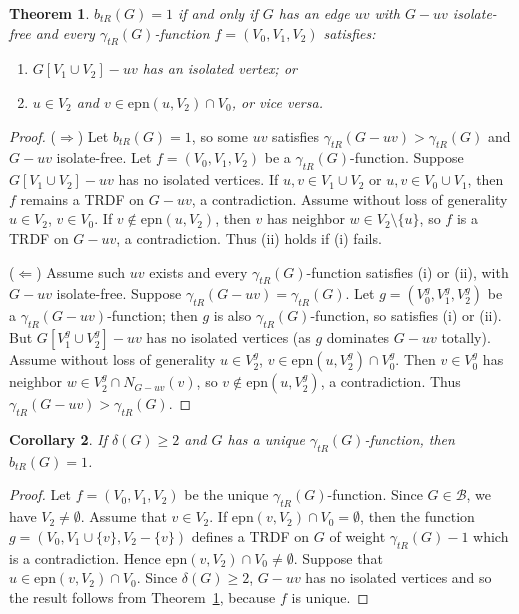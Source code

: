\documentclass[12pt,reqno]{amsart}
\theoremstyle{plain}
\newtheorem{theorem}{Theorem}
\newtheorem{corollary}[theorem]{Corollary}
\numberwithin{equation}{section}
\begin{document}
\begin{theorem}\label{tb1}
$b_{tR}(G) = 1$ if and only if $G$ has an edge $uv$ with $G - uv$ isolate-free and every $\gamma_{tR}(G)$-function $f = (V_0, V_1, V_2)$ satisfies:
\begin{enumerate}
\item[(i)] $G[V_1 \cup V_2] - uv$ has an isolated vertex; or
\item[(ii)] $u \in V_2$ and $v \in \mathrm{epn}(u, V_2) \cap V_0$, or vice versa.
\end{enumerate}
\end{theorem}
\begin{proof}
($\Rightarrow$) Let $b_{tR}(G) = 1$, so some $uv$ satisfies $\gamma_{tR}(G - uv) > \gamma_{tR}(G)$ and $G - uv$ isolate-free. Let $f = (V_0, V_1, V_2)$ be a $\gamma_{tR}(G)$-function. Suppose $G[V_1 \cup V_2] - uv$ has no isolated vertices. If $u,v \in V_1 \cup V_2$ or $u,v \in V_0 \cup V_1$, then $f$ remains a TRDF on $G - uv$, a contradiction. Assume without loss of generality $u \in V_2$, $v \in V_0$. If $v \notin \mathrm{epn}(u, V_2)$, then $v$ has neighbor $w \in V_2 \setminus \{u\}$, so $f$ is a TRDF on $G - uv$, a contradiction. Thus (ii) holds if (i) fails.

($\Leftarrow$) Assume such $uv$ exists and every $\gamma_{tR}(G)$-function satisfies (i) or (ii), with $G - uv$ isolate-free. Suppose $\gamma_{tR}(G - uv) = \gamma_{tR}(G)$. Let $g = (V^g_0, V^g_1, V^g_2)$ be a $\gamma_{tR}(G - uv)$-function; then $g$ is also $\gamma_{tR}(G)$-function, so satisfies (i) or (ii). But $G[V^g_1 \cup V^g_2] - uv$ has no isolated vertices (as $g$ dominates $G - uv$ totally). Assume without loss of generality $u \in V^g_2$, $v \in \mathrm{epn}(u, V^g_2) \cap V^g_0$. Then $v \in V^g_0$ has neighbor $w \in V^g_2 \cap N_{G - uv}(v)$, so $v \notin \mathrm{epn}(u, V^g_2)$, a contradiction. Thus $\gamma_{tR}(G - uv) > \gamma_{tR}(G)$.
\end{proof}

\begin{corollary}
If $\delta(G) \geq 2$ and $G$ has a unique $\gamma_{tR}(G)$-function, then $b_{tR}(G) = 1$.
\end{corollary}
\begin{proof}
Let $f=(V_0,V_1,V_2)$ be the unique $\gamma_{tR}(G)$-function. Since $G \in \mathcal{B}$, we have $V_2 \neq \emptyset$.
Assume that $v \in V_2$.
If $\mathrm{epn}(v,V_2) \cap V_0  = \emptyset$, then
the function  $g=(V_0,V_1 \cup \{v\},V_2-\{v\})$
defines a TRDF on $G$ of weight $\gamma_{tR}(G)-1$ which is a contradiction.
Hence $\mathrm{epn}(v,V_2) \cap V_0 \neq \emptyset$.
Suppose that $u \in \mathrm{epn}(v,V_2) \cap V_0 $. Since $\delta (G)\geq 2$, $G-uv$ has no isolated vertices and so the result follows from Theorem~\ref{tb1}, because $f$ is unique.
\end{proof}
\end{document}
